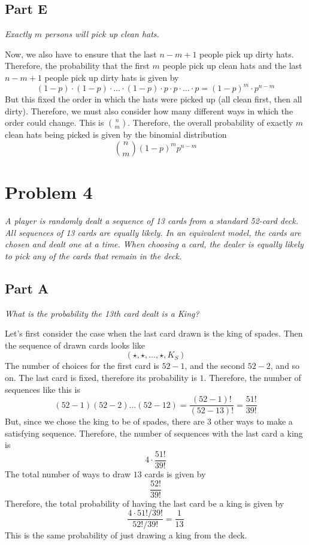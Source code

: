 \documentclass{article}
\begin{document}
\subsection*{Part E}

\textit{Exactly $ m $ persons will pick up clean hats.}

\bigbreak

Now, we also have to ensure that the last $ n - m + 1 $ people pick up dirty
hats. Therefore, the probability that the first $ m $ people pick up clean
hats and the last $ n - m + 1 $ people pick up dirty hats is given by
$$ (1 - p) \cdot (1 - p) \cdot \ldots \cdot (1 - p) \cdot p \cdot p \cdot
\ldots \cdot p = (1 - p)^m \cdot p^{n - m} $$
But this fixed the order in which the hats were picked up (all clean first,
then all dirty). Therefore, we must also consider how many different ways
in which the order could change. This is $ \binom{n}{m} $. Therefore, the
overall probability of exactly $ m $ clean hats being picked is given by
the binomial distribution
$$ \binom{n}{m} (1 - p)^m p^{n - m} $$

\section*{Problem 4}

\textit{A player is randomly dealt a sequence of 13 cards from a standard
52-card deck. All sequences of 13 cards are equally likely. In an equivalent
model, the cards are chosen and dealt one at a time. When choosing a card,
the dealer is equally likely to pick any of the cards that remain in the
deck.}

\subsection*{Part A}

\textit{What is the probability the 13th card dealt is a King?}

\bigbreak

Let's first consider the case when the last card drawn is the king of spades.
Then the sequence of drawn cards looks like
$$ ( \star, \star, \ldots, \star, K_S ) $$
The number of choices for the first card is $ 52 - 1 $, and the second $ 52 -
2 $, and so on. The last card is fixed, therefore its probability is $ 1 $.
Therefore, the number of sequences like this is
$$ (52 - 1)(52 - 2) \ldots (52 - 12) = \frac{(52 - 1)!}{(52 - 13)!} =
\frac{51!}{39!} $$
But, since we chose the king to be of spades, there are 3 other ways to make
a satisfying sequence. Therefore, the number of sequences with the last card
a king is
$$ 4 \cdot \frac{51!}{39!} $$
The total number of ways to draw $ 13 $ cards is given by
$$ \frac{52!}{39!} $$
Therefore, the total probability of having the last card be a king is given by
$$ \frac{4 \cdot 51! / 39!}{52! / 39!} = \frac{1}{13} $$
This is the same probability of just drawing a king from the deck.
\end{document}
